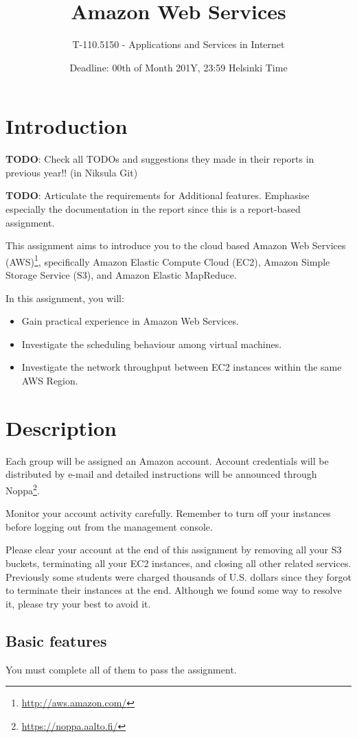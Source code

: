 \documentclass[12pt, a4paper]{article}
\title{Amazon Web Services}
\author{T-110.5150 - Applications and Services in Internet}
\date{Deadline: 00th of Month 201Y, 23:59 Helsinki Time}
\begin{document}
\maketitle
\section{Introduction}

\textbf{TODO}: Check all TODOs and suggestions they made in their reports in previous year!! (in Niksula Git)

\textbf{TODO}: Articulate the requirements for Additional features.
Emphasise especially the documentation in the report since this is a report-based assignment.
\vskip 15pt

This assignment aims to introduce you to the cloud based Amazon Web Services (AWS)\footnote{\url{http://aws.amazon.com/}}, specifically Amazon Elastic Compute Cloud (EC2), Amazon Simple Storage Service (S3), and Amazon Elastic MapReduce.

In this assignment, you will:
\begin{itemize}
\item Gain practical experience in Amazon Web Services.
\item Investigate the scheduling behaviour among virtual machines.
\item Investigate the network throughput between EC2 instances within the same AWS Region.
\end{itemize}

\section{Description}
Each group will be assigned an Amazon account.
Account credentials will be distributed by e-mail and detailed instructions will be announced through Noppa\footnote{\url{https://noppa.aalto.fi/}}.

Monitor your account activity carefully.
Remember to turn off your instances before logging out from the management console.

Please clear your account at the end of this assignment by removing all your S3 buckets, terminating all your EC2 instances, and closing all other related services.
Previously some students were charged thousands of U.S. dollars since they forgot to terminate their instances at the end.
Although we found some way to resolve it, please try your best to avoid it.


\subsection{Basic features}
You must complete all of them to pass the assignment.
\end{document}
